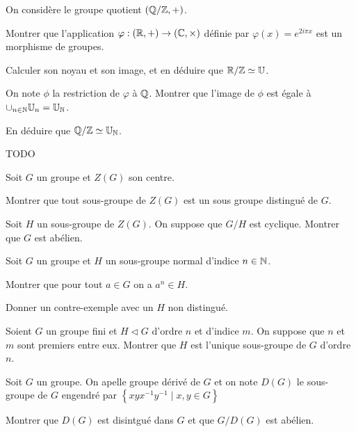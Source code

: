 \documentclass{report}
\begin{document}
\begin{exo}
    On considère le groupe quotient \(\left(\mathbb{Q}/\mathbb{Z},+\right)\).
    \begin{q}{1}
        Montrer que l'application \(\varphi : \left(\mathbb{R},+\right)\to\left(\mathbb{C},\times\right)\)
        définie par \(\varphi(x)=e^{2i\pi x}\) est un morphisme de groupes.
    \end{q}
    \begin{q}{2}
        Calculer son noyau et son image, et en déduire que \(\mathbb{R}/\mathbb{Z}\simeq \mathbb{U}\).
    \end{q}
    \begin{q}{3}
        On note \(\phi\) la restriction de \(\varphi\) à \(\mathbb{Q}\). Montrer que l'image
        de \(\phi\) est égale à \(\cup_{n\in\mathbb{N}} \mathbb{U}_n = \mathbb{U}_{\mathbb{N}}\).
    \end{q}
    \begin{q}{4}
        En déduire que \(\mathbb{Q}/\mathbb{Z}\simeq \mathbb{U}_{\mathbb{N}}\).
    \end{q}
\end{exo}

\begin{exo}
    TODO
\end{exo}

\begin{exo}
    Soit \(G\) un groupe et \(Z(G)\) son centre.
    \begin{q}{1}
        Montrer que tout sous-groupe de \(Z(G)\) est un sous groupe distingué
        de \(G\).
    \end{q}
    \begin{q}{2}
        Soit \(H\) un sous-groupe de \(Z(G)\). On suppose que \(G/H\)
        est cyclique. Montrer que \(G\) est abélien.
    \end{q}
\end{exo}

\begin{exo}
    Soit \(G\) un groupe et \(H\) un sous-groupe normal d'indice \(n\in\mathbb{N}\).
    \begin{q}{1}
        Montrer que pour tout \(a\in G\) on a \(a^n\in H\).
    \end{q}
    \begin{q}{1}
        Donner un contre-exemple avec un \(H\) non distingué.
    \end{q}
\end{exo}

\begin{exo}
    Soient \(G\) un groupe fini et \(H\triangleleft G\) d'ordre \(n\)
    et d'indice \(m\). On suppose que \(n\) et \(m\) sont premiers entre
    eux. Montrer que \(H\) est l'unique sous-groupe de \(G\) d'ordre \(n\).
\end{exo}

\begin{exo}
    Soit \(G\) un groupe. On apelle groupe dérivé de \(G\) et on note \(D(G)\)
    le sous-groupe de \(G\) engendré par \(\left\{ xyx^{-1}y^{-1}\mid x,y\in G \right\}\)
    \begin{q}{1}
        Montrer que \(D(G)\) est disintgué dans \(G\) et que \(G/D(G)\) est abélien.
    \end{q}
\end{exo}
\end{document}

